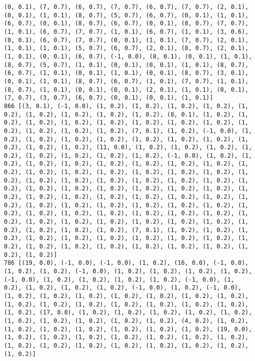 \documentclass[11pt]{article}
\begin{document}
\begin{Verbatim}[commandchars=\\\{\}]
(0, 0.1), (7, 0.7), (6, 0.7), (7, 0.7), (6, 0.7), (7, 0.7), (2, 0.1), (0, 0.1), (1, 0.1), (8, 0.7), (5, 0.7), (6, 0.7), (0, 0.1), (1, 0.1), (6, 0.7), (0, 0.1), (8, 0.7), (6, 0.7), (0, 0.1), (8, 0.7), (7, 0.7), (1, 0.1), (6, 0.7), (7, 0.7), (1, 0.1), (6, 0.7), (1, 0.1), (3, 0.6), (0, 0.1), (6, 0.7), (7, 0.7), (0, 0.1), (1, 0.1), (7, 0.7), (2, 0.1), (1, 0.1), (1, 0.1), (5, 0.7), (6, 0.7), (2, 0.1), (8, 0.7), (2, 0.1), (1, 0.1), (0, 0.1), (6, 0.7), (-1, 0.0), (8, 0.1), (0, 0.1), (1, 0.1), (8, 0.7), (5, 0.7), (1, 0.1), (0, 0.1), (0, 0.1), (1, 0.1), (8, 0.7), (6, 0.7), (1, 0.1), (0, 0.1), (1, 0.1), (0, 0.1), (8, 0.7), (3, 0.1), (0, 0.1), (1, 0.1), (8, 0.7), (6, 0.7), (1, 0.1), (7, 0.7), (1, 0.1), (8, 0.7), (1, 0.1), (0, 0.1), (0, 0.1), (2, 0.1), (1, 0.1), (0, 0.1), (7, 0.7), (3, 0.7), (6, 0.7), (0, 0.1), (0, 0.1), (1, 0.1)]
866 [(3, 0.1), (-1, 0.0), (1, 0.2), (1, 0.2), (1, 0.2), (1, 0.2), (1, 0.2), (1, 0.2), (1, 0.2), (1, 0.2), (1, 0.2), (8, 0.1), (1, 0.2), (1, 0.2), (1, 0.2), (1, 0.2), (1, 0.2), (1, 0.2), (1, 0.2), (1, 0.2), (1, 0.2), (1, 0.2), (1, 0.2), (1, 0.2), (7, 0.1), (1, 0.2), (-1, 0.0), (1, 0.2), (1, 0.2), (1, 0.2), (1, 0.2), (1, 0.2), (1, 0.2), (1, 0.2), (1, 0.2), (1, 0.2), (1, 0.2), (11, 0.0), (1, 0.2), (1, 0.2), (1, 0.2), (1, 0.2), (1, 0.2), (1, 0.2), (1, 0.2), (1, 0.2), (-1, 0.0), (1, 0.2), (1, 0.2), (1, 0.2), (1, 0.2), (1, 0.2), (1, 0.2), (1, 0.2), (1, 0.2), (1, 0.2), (1, 0.2), (1, 0.2), (1, 0.2), (1, 0.2), (1, 0.2), (1, 0.2), (1, 0.2), (1, 0.2), (1, 0.2), (1, 0.2), (1, 0.2), (1, 0.2), (1, 0.2), (1, 0.2), (1, 0.2), (1, 0.2), (1, 0.2), (1, 0.2), (1, 0.2), (1, 0.2), (1, 0.2), (1, 0.2), (1, 0.2), (1, 0.2), (1, 0.2), (1, 0.2), (1, 0.2), (1, 0.2), (1, 0.2), (1, 0.2), (1, 0.2), (1, 0.2), (1, 0.2), (1, 0.2), (1, 0.2), (1, 0.2), (1, 0.2), (1, 0.2), (1, 0.2), (1, 0.2), (1, 0.2), (1, 0.2), (1, 0.2), (1, 0.2), (1, 0.2), (1, 0.2), (1, 0.2), (1, 0.2), (1, 0.2), (1, 0.2), (1, 0.2), (1, 0.2), (7, 0.1), (1, 0.2), (1, 0.2), (1, 0.2), (1, 0.2), (1, 0.2), (1, 0.2), (1, 0.2), (1, 0.2), (1, 0.2), (1, 0.2), (1, 0.2), (1, 0.2), (1, 0.2), (1, 0.2), (1, 0.2), (1, 0.2), (1, 0.2), (1, 0.2)]
786 [(19, 0.0), (-1, 0.0), (-1, 0.0), (1, 0.2), (16, 0.0), (-1, 0.0), (1, 0.2), (1, 0.2), (-1, 0.0), (1, 0.2), (1, 0.2), (1, 0.2), (1, 0.2), (-1, 0.0), (1, 0.2), (1, 0.2), (1, 0.2), (1, 0.2), (-1, 0.0), (1, 0.2), (1, 0.2), (1, 0.2), (1, 0.2), (-1, 0.0), (1, 0.2), (-1, 0.0), (1, 0.2), (1, 0.2), (1, 0.2), (1, 0.2), (1, 0.2), (1, 0.2), (1, 0.2), (1, 0.2), (1, 0.2), (1, 0.2), (1, 0.2), (1, 0.2), (1, 0.2), (1, 0.2), (1, 0.2), (17, 0.0), (1, 0.2), (1, 0.2), (1, 0.2), (1, 0.2), (1, 0.2), (1, 0.2), (1, 0.2), (1, 0.2), (1, 0.2), (1, 0.2), (4, 0.2), (1, 0.2), (1, 0.2), (1, 0.2), (1, 0.2), (1, 0.2), (1, 0.2), (1, 0.2), (19, 0.0), (1, 0.2), (1, 0.2), (1, 0.2), (1, 0.2), (1, 0.2), (1, 0.2), (1, 0.2), (1, 0.2), (1, 0.2), (1, 0.2), (1, 0.2), (1, 0.2), (1, 0.2), (1, 0.2), (1, 0.2)]

\end{Verbatim}
\end{document}
